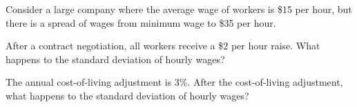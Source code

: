 

Consider a large company where the average wage of workers is \$15 per hour, but there is a spread of wages from minimum wage to \$35 per hour.  


After a contract negotiation, all workers receive a \$2 per hour raise.
What happens to the standard deviation of hourly wages?
\begin{MultipleChoice}
\end{MultipleChoice}

The annual cost-of-living adjustment is 3\%.  After the cost-of-living adjustment, what happens to the standard deviation of hourly wages?
\begin{MultipleChoice}
\end{MultipleChoice}